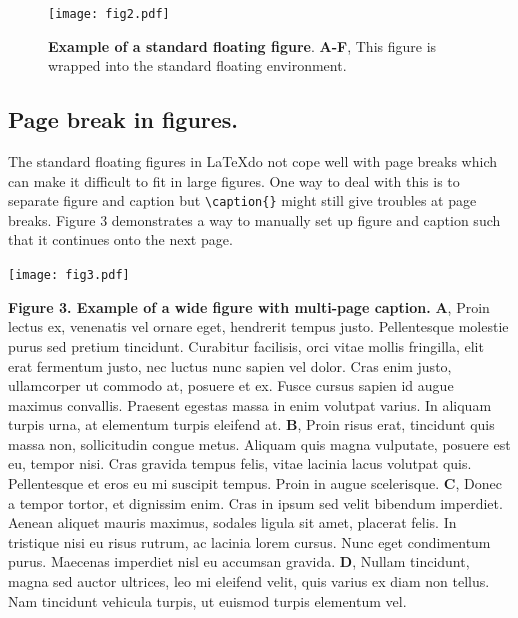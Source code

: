 \documentclass[10pt,letterpaper]{article}
\begin{document}
\begin{figure}[ht] %


\texttt{[image: fig2.pdf]}

\caption{\color{Gray} \textbf{Example of a standard floating figure}. \textbf{A-F}, This figure is wrapped into the standard floating environment.}

\label{fig2} %

\end{figure}

\subsection*{Page break in figures.}
The standard floating figures in \LaTeX do not cope well with page breaks which can make it difficult to fit in large figures. One way to deal with this is to separate figure and caption but \verb!\caption{}! might still give troubles at page breaks. Figure 3 demonstrates a way to manually set up figure and caption such that it continues onto the next page.
\vspace{.5cm} %
\begin{adjustwidth}{-2in}{0in}
\begin{flushright}
\texttt{[image: fig3.pdf]}
\end{flushright}
\justify 
\color{Gray}
\textbf {Figure 3. Example of a wide figure with multi-page caption.}
\textbf{A}, Proin lectus ex, venenatis vel ornare eget, hendrerit tempus justo. Pellentesque molestie purus sed pretium tincidunt. Curabitur facilisis, orci vitae mollis fringilla, elit erat fermentum justo, nec luctus nunc sapien vel dolor. Cras enim justo, ullamcorper ut commodo at, posuere et ex. Fusce cursus sapien id augue maximus convallis. Praesent egestas massa in enim volutpat varius. In aliquam turpis urna, at elementum turpis eleifend at. \textbf{B}, Proin risus erat, tincidunt quis massa non, sollicitudin congue metus. Aliquam quis magna vulputate, posuere est eu, tempor nisi. Cras gravida tempus felis, vitae lacinia lacus volutpat quis. Pellentesque et eros eu mi suscipit tempus. Proin in augue scelerisque. \textbf{C}, Donec a tempor tortor, et dignissim enim. Cras in ipsum sed velit bibendum imperdiet. Aenean aliquet mauris maximus, sodales ligula sit amet, placerat felis. In tristique nisi eu risus rutrum, ac lacinia lorem cursus. Nunc eget condimentum purus. Maecenas imperdiet nisl eu accumsan gravida. \textbf{D}, Nullam tincidunt, magna sed auctor ultrices, leo mi eleifend velit, quis varius ex diam non tellus. Nam tincidunt vehicula turpis, ut euismod turpis elementum vel.
\end{adjustwidth}
\end{document}
